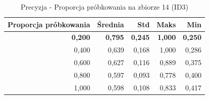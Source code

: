 \begin{table}[htbp]
\centering
\small
\setlength{\tabcolsep}{6pt}
\renewcommand{\arraystretch}{1.2}
\caption{Precyzja - Proporcja próbkowania na zbiorze 14 (ID3)}
\label{tab:ID3_sample_ratio_14_precision}
\begin{tabular}{r|r|r|r|r}
\toprule
Proporcja próbkowania & Średnia & Std & Maks & Min \\
\hline
\textbf{0,200} & \textbf{0,795} & \textbf{0,245} & \textbf{1,000} & \textbf{0,250} \\
0,400 & 0,639 & 0,168 & 1,000 & 0,286 \\
0,600 & 0,627 & 0,116 & 0,889 & 0,375 \\
0,800 & 0,597 & 0,093 & 0,778 & 0,400 \\
1,000 & 0,598 & 0,108 & 0,833 & 0,417 \\
\bottomrule
\end{tabular}
\end{table}